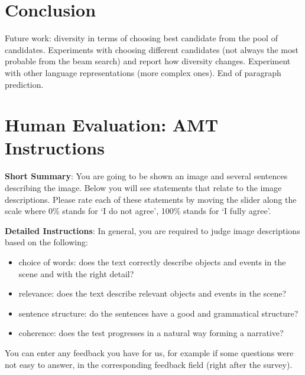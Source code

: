 \documentclass[11pt,a4paper]{article}
\begin{document}
\section{Conclusion}
Future work: diversity in terms of choosing best candidate from the pool of candidates.
Experiments with choosing different candidates (not always the most probable from the beam search) and report how diversity changes.
Experiment with other language representations (more complex ones).
End of paragraph prediction.







\appendix

\section{Human Evaluation: AMT Instructions}
\label{sec:supplemental}

\textbf{Short Summary}:
You are going to be shown an image and several sentences describing the image.
Below you will see statements that relate to the image descriptions.
Please rate each of these statements by moving the slider along the scale where 0\% stands for ‘I do not agree’, 100\% stands for ‘I fully agree’.

\vspace{.5cm}
\textbf{Detailed Instructions}:
In general, you are required to judge image descriptions based on the following:
\begin{itemize}
	\item choice of words: does the text correctly describe objects and events in the scene and with the right detail?
	\item relevance: does the text describe relevant objects and events in the scene?
	\item sentence structure: do the sentences have a good and grammatical structure?
	\item coherence: does the test progresses in a natural way forming a narrative?
\end{itemize}
You can enter any feedback you have for us, for example if some questions were not easy to answer, in the corresponding feedback field (right after the survey).
\end{document}
